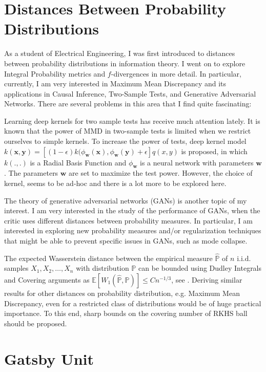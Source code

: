 \documentclass[]{article}
\newcommand{\bw}{\mathbf{w}}
\newcommand{\bx}{\mathbf{x}}
\begin{document}
\section{Distances Between Probability Distributions}

As a student of Electrical Engineering, I was first introduced to distances between probability distributions in information theory. I went on to explore Integral Probability metrics and $f$-divergences in more detail. In particular, currently, I am very interested in Maximum Mean Discrepancy and its applications in Causal Inference, Two-Sample Tests, and Generative Adversarial Networks. There are several problems in this area that I find quite fascinating:

Learning deep kernels for two sample tests has receive much attention lately. It is known that the power of MMD in two-sample tests is limited when we restrict ourselves to simple kernels. To increase the power of tests, deep kernel model $k(\bx, \textbf{y}) = [(1-\epsilon)k(\phi_\bw(\bx), \phi_\bw(\mathbf{y}) + \epsilon]q(x, y)$ is proposed, in which $k(.,.)$ is a Radial Basis Function and $\phi_\bw$ is a neural network with parameters $\bw$ \cite{liu2020learning}.  The parameters $\bw$ are set to maximize the test power. However, the choice of kernel, seems to be ad-hoc and there is a lot more to be explored here. 


The theory of generative adversarial networks (GANs) is another topic of my interest. I am very interested in the study of the performance of GANs, when the critic uses different distances between probability measures. In particular, I am interested in exploring new probability measures and/or regularization techniques that might be able to prevent specific issues in GANs, such as mode collapse. 

The expected Wasserstein distance between the empirical measure $\hat{\mathbb{P}}$ of $n$ i.i.d. samples $X_1, X_2, \dots, X_n$ with distribution $ \mathbb{P}$ can be bounded using Dudley Integrals and Covering  arguments as 
$\mathbb{E}[W_1(\hat{\mathbb{P}}, \mathbb{P})] \leq Cn^{-1/3}$, see \cite{van2014probability}. Deriving similar results for other distances on probability distribution, e.g. Maximum Mean Discrepancy, even for a restricted class of distributions would be of huge practical importance. To this end, sharp bounds on the covering number of RKHS ball should be proposed.


\section{Gatsby Unit}
\end{document}
